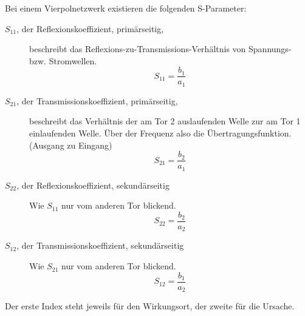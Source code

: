 Bei einem Vierpolnetzwerk existieren die folgenden S-Parameter:
\begin{description}
  \item[$S_{11}$, der Reflexionskoeffizient, primärseitig,] beschreibt das
    Reflexions-zu-Transmissions-Verhältnis von Spannungs- bzw. Stromwellen.
    \[S_{11} = \frac{b_1}{a_1}\]
    \item[$S_{21}$, der Transmissionskoeffizient, primärseitig,] beschreibt das
      Verhältnis der am Tor 2 auslaufenden Welle zur am Tor 1 einlaufenden
      Welle. Über der Frequenz also die Übertragungsfunktion. (\glqq Ausgang zu
      Eingang\grqq)
      \[S_{21} = \frac{b_2}{a_1}\]
    \item[$S_{22}$, der Reflexionskoeffizient, sekundärseitig]
      Wie $S_{11}$ nur vom anderen Tor blickend.
      \[S_{22} = \frac{b_2}{a_2}\]
    \item[$S_{12}$, der Transmissionskoeffizient, sekundärseitig]
      Wie $S_{21}$ nur vom anderen Tor blickend.
      \[S_{12} = \frac{b_1}{a_2}\]
\end{description}

Der erste Index steht jeweils für den Wirkungsort, der zweite für die Ursache.
